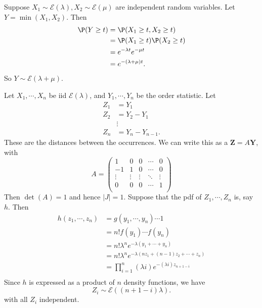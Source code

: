 \documentclass[a4paper]{article}
\begin{document}
\begin{eg}
  Suppose $X_1\sim \mathcal{E}(\lambda), X_2\sim \mathcal{E}(\mu)$ are independent random variables. Let $Y = \min(X_1, X_2)$. Then
  \begin{align*}
    \P(Y \geq t) &= \P(X_1 \geq t, X_2 \geq t)\\
    &= \P(X_1\geq t)\P(X_2 \geq t)\\
    &= e^{-\lambda t}e^{-\mu t}\\
    &= e^{-(\lambda +\mu)t}.
  \end{align*}
  So $Y\sim \mathcal{E}(\lambda + \mu)$.
\end{eg}

\begin{eg}
  Let $X_1, \cdots, X_n$ be iid $\mathcal{E}(\lambda)$, and $Y_1, \cdots, Y_n$ be the order statistic. Let
  \begin{align*}
    Z_1 &= Y_1\\
    Z_2 &= Y_2 - Y_1\\
    &\vdots\\
    Z_n &= Y_n - Y_{n - 1}.
  \end{align*}
  These are the distances between the occurrences. We can write this as a $\mathbf{Z} = A\mathbf{Y}$, with
  \[
    A =
    \begin{pmatrix}
      1 & 0 & 0 & \cdots&  0\\
      -1 & 1 & 0 & \cdots & 0\\
      \vdots & \vdots & \vdots & \ddots & \vdots\\
      0 & 0 & 0 & \cdots & 1\\
    \end{pmatrix}
  \]
  Then $\det (A) = 1$ and hence $|J| = 1$. Suppose that the pdf of $Z_1, \cdots, Z_n$ is, say $h$. Then
  \begin{align*}
    h(z_1, \cdots, z_n) &= g(y_1, \cdots, y_n)\cdots 1\\
    &= n!f(y_1) \cdots f(y_n)\\
    &= n!\lambda^n e^{-\lambda (y_1 + \cdots + y_n)}\\
    &= n!\lambda^n e^{-\lambda (nz_1 + (n - 1)z_2 + \cdots + z_n)}\\
    &= \prod_{i = 1}^n (\lambda i)e^{-(\lambda i)z_{n + 1 - i}}\\
  \end{align*}
  Since $h$ is expressed as a product of $n$ density functions, we have
  \[
    Z_i \sim \mathcal{E}((n + 1 - i)\lambda).
  \]
  with all $Z_i$ independent.
\end{eg}
\end{document}
